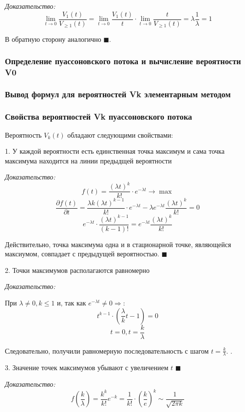 \documentclass[aps,%
12pt,%
final,%
oneside,
onecolumn,%
musixtex, %
superscriptaddress,%
centertags]{article} %
\theoremstyle{plain}
\begin{document}
\textit{Доказательство:}
$$\lim_{t \to 0} \frac{V_{1}(t)}{V_{\geq 1}(t)} = \lim_{t \to 0} \frac{V_{1}(t)}{t} \cdot \lim_{t \to 0} \frac{t}{V_{\geq 1}(t)} = \lambda \frac{1}{\lambda} = 1$$

В обратную сторону аналогично $\blacksquare$.

\subsubsection{Определение пуассоновского потока и вычисление вероятности V0}
\subsubsection{Вывод формул для вероятностей Vk элементарным методом}
\subsubsection{Свойства вероятностей Vk пуассоновского потока}

Вероятность $V_k(t)$ обладают следующими свойствами:

1. У каждой вероятности есть единственная точка максимум и сама точка максимума находится на линии предыдщей вероятности

\textit{Доказательство:}
$$f(t) = \frac{(\lambda t)^k}{k!} \cdot e^{-\lambda t} \to \max $$
$$\frac{\partial f(t)}{\partial t} = \frac{\lambda k (\lambda t)^{k-1}}{k!} \cdot e^{-\lambda t} - \lambda e^{-\lambda t} \frac{(\lambda t)^k}{k!} = 0$$
$$e^{-\lambda t} \cdot \frac{(\lambda t)^{k-1}}{(k-1)!} = e^{-\lambda t} \frac{(\lambda t)^k}{k!} $$

Действительно, точка максимума одна и в стационарной точке, являющейся максиумом, совпадает с предыдущей вероятностью. $\blacksquare$

2. Точки максимумов располагаются равномерно 

\textit{Доказательство:}

При $\lambda \neq 0, k \leq 1$ и, так как $e^{-\lambda t} \neq 0 \Rightarrow$:
$$ t^{k-1} \cdot ({\frac{\lambda}{k}t - 1})=0$$
$$t=0, t=\frac{k}{\lambda}$$

Следовательно, получили равномерную последовательность с шагом $t=\frac{k}{\lambda}$. .

3. Значение точек максимумов убывают с увеличением $t$ $\blacksquare$

\textit{Доказательство:}
$$f(\frac{k}{\lambda}) = \frac{k^k}{k!}e^{-k} = \frac{1}{k!}\cdot \left (\frac{k}{e} \right )^k \sim \frac{1}{\sqrt {2\pi k}}$$
\end{document}
